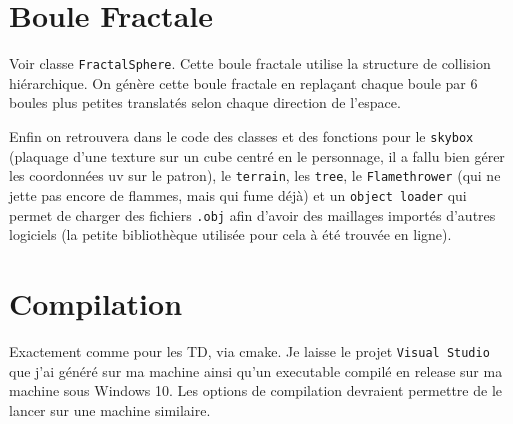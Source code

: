 \documentclass[10pt, a4paper]{article}
\theoremstyle{definition}
\begin{document}
\section{Boule Fractale}
Voir classe \texttt{FractalSphere}. Cette boule fractale utilise la structure de collision hiérarchique.
On génère cette boule fractale en replaçant chaque boule par 6 boules plus petites translatés selon chaque direction de l'espace.

\bigbreak

Enfin on retrouvera dans le code des classes et des fonctions pour le \texttt{skybox} (plaquage d'une texture sur un cube centré en le personnage, il a fallu bien gérer les coordonnées uv sur le patron), le \texttt{terrain}, les \texttt{tree}, le \texttt{Flamethrower} (qui ne jette pas encore de flammes, mais qui fume déjà) et un \texttt{object loader} qui permet de charger des fichiers \texttt{.obj} afin d'avoir des maillages importés d'autres logiciels (la petite bibliothèque utilisée pour cela à été trouvée en ligne).

\section*{Compilation}
Exactement comme pour les TD, via cmake. Je laisse le projet \texttt{Visual Studio} que j'ai généré sur ma machine ainsi qu'un executable compilé en release sur ma machine sous Windows 10. Les options de compilation devraient permettre de le lancer sur une machine similaire.
\end{document}
